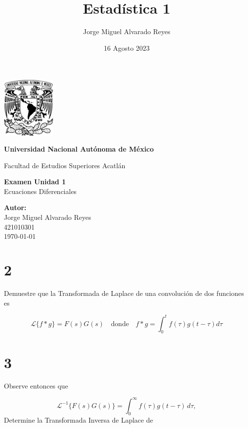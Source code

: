 \documentclass{article}
\title{Estadística 1}
\author{Jorge Miguel Alvarado Reyes}
\date{16 Agosto 2023}
\begin{document}
\begin{titlepage}
    \begin{center}
        \includegraphics[width=0.2\textwidth]{../../unam.png}
        \vspace*{.5cm}

        \LARGE
        \textbf{Universidad Nacional Autónoma de México}

        \vspace{0.5cm}
        \LARGE
        Facultad de Estudios Superiores Acatlán

        \vspace{2cm}

        \textbf{Examen Unidad 1} \\
        Ecuaciones Diferenciales

        \vfill

        \vspace{1cm}

        \textbf{\large Autor:} \\
        Jorge Miguel Alvarado Reyes \\
        421010301\\
        \vspace{.5cm}
        \normalsize \today

    \end{center}
\end{titlepage}
\newpage

\tableofcontents

\newpage
\section{2}
Demuestre que la Transformada de Laplace de una convolución de dos funciones es

\[
    \mathcal{L} \{ f*g \} = F(s)G(s) \quad \text{donde} \quad f*g = \int_{0}^{t} f(\tau) g(t - \tau) d\tau
\]
\section{3}
Observe entonces que

\[
    \mathcal{L}^{-1}\{F(s)G(s)\} = \int_0^{\infty} f(\tau)g(t - \tau) \, d\tau,
\]
Determine la Transformada Inversa de Laplace de
\end{document}
